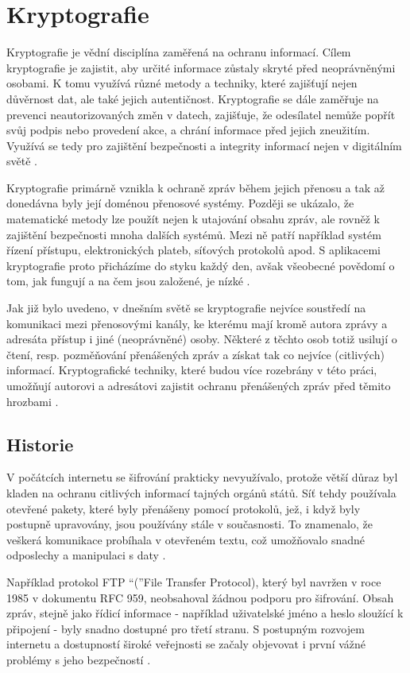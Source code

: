 \section{Kryptografie}
Kryptografie je vědní disciplína zaměřená na ochranu informací. Cílem kryptografie je zajistit, aby určité informace zůstaly skryté před neoprávněnými osobami. K tomu využívá různé metody a techniky, které zajišťují nejen důvěrnost dat, ale také jejich autentičnost. Kryptografie se dále zaměřuje na prevenci neautorizovaných změn v datech, zajišťuje, že odesílatel nemůže popřít svůj podpis nebo provedení akce, a chrání informace před jejich zneužitím. Využívá se tedy pro zajištění bezpečnosti a integrity informací nejen v digitálním světě \parencite{tesar2021}.

Kryptografie primárně vznikla k ochraně zpráv během jejich přenosu a tak až donedávna byly její doménou přenosové systémy. Později se ukázalo, že matematické metody lze použít nejen k utajování obsahu zpráv, ale rovněž k zajištění bezpečnosti mnoha dalších systémů. Mezi ně patří například systém řízení přístupu, elektronických plateb, síťových protokolů apod. S aplikacemi kryptografie proto přicházíme do styku každý den, avšak všeobecné povědomí o tom, jak fungují a na čem jsou založené, je nízké \parencite{burda2019}.

Jak již bylo uvedeno, v dnešním světě se kryptografie nejvíce soustředí na komunikaci mezi přenosovými kanály, ke kterému mají kromě autora zprávy a adresáta přístup i jiné (neoprávněné) osoby. Některé z těchto osob totiž usilují o čtení, resp. pozměňování přenášených zpráv a získat tak co nejvíce (citlivých) informací. Kryptografické techniky, které budou více rozebrány v této práci, umožňují autorovi a adresátovi zajistit ochranu přenášených zpráv před těmito hrozbami \parencite{sedlak2021}.

\subsection{Historie}

V počátcích internetu se šifrování prakticky nevyužívalo, protože větší důraz byl kladen na ochranu citlivých informací tajných orgánů států. Síť tehdy používala otevřené pakety, které byly přenášeny pomocí protokolů, jež, i když byly postupně upravovány, jsou používány stále v současnosti. To znamenalo, že veškerá komunikace probíhala v otevřeném textu, což umožňovalo snadné odposlechy a manipulaci s daty \parencite{erben2014}.

Například protokol FTP \enquote({File Transfer Protocol}), který byl navržen v roce 1985 v dokumentu RFC 959, neobsahoval žádnou podporu pro šifrování. Obsah zpráv, stejně jako řídicí informace - například uživatelské jméno a heslo sloužící k připojení - byly snadno dostupné pro třetí stranu. S postupným rozvojem internetu a dostupností široké veřejnosti se začaly objevovat i první vážné problémy s jeho bezpečností \parencite{cerna2012}.

